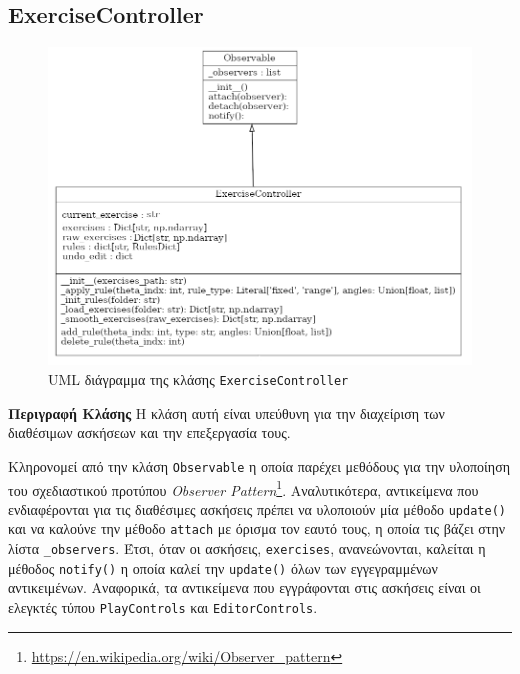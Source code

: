 \subsection{ExerciseController}
\label{sec:exercise_controller}
\begin{figure}[H]
	\centering
	\includegraphics[scale=0.4]{images/chapter5/exercise_controller.png}
	\caption{UML διάγραμμα της κλάσης \texttt{ExerciseController}}
	\label{fig:controls}
\end{figure}

\noindent\textbf{Περιγραφή Κλάσης}
Η κλάση αυτή είναι υπεύθυνη για την διαχείριση των διαθέσιμων ασκήσεων και την επεξεργασία τους. 

Κληρονομεί από την κλάση \texttt{Observable} η οποία παρέχει μεθόδους για την υλοποίηση του σχεδιαστικού προτύπου \textsl{Observer Pattern}\footnote{\href{https://en.wikipedia.org/wiki/Observer\_pattern}{https://en.wikipedia.org/wiki/Observer\_pattern}}.
Αναλυτικότερα, αντικείμενα που ενδιαφέρονται για τις διαθέσιμες ασκήσεις πρέπει να υλοποιούν μία μέθοδο \texttt{update()} και να καλούνε την μέθοδο \texttt{attach} με όρισμα τον εαυτό τους, η οποία τις βάζει στην λίστα \texttt{\_observers}. Έτσι, όταν οι ασκήσεις, \texttt{exercises}, ανανεώνονται, καλείται η μέθοδος \texttt{notify()} η οποία καλεί την \texttt{update()} όλων των εγγεγραμμένων αντικειμένων. Αναφορικά, τα αντικείμενα που εγγράφονται στις ασκήσεις είναι οι ελεγκτές τύπου \texttt{PlayControls} και \texttt{EditorControls}.

